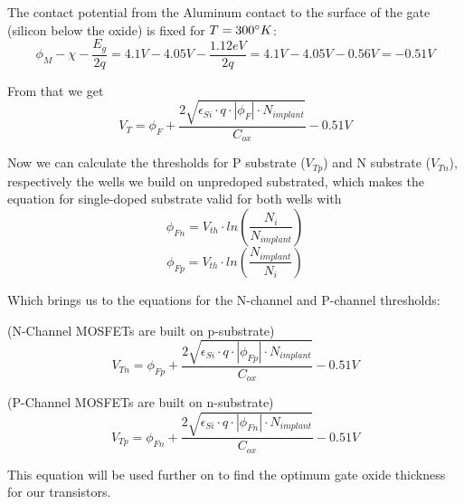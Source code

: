 The contact potential from the Aluminum contact to the surface of the gate (silicon below the oxide) is fixed for $T=300\degree K$:
\begin{equation}
\phi_{M} -  \chi - \frac{E_g}{2 q} = 4.1V - 4.05V - \frac{1.12eV}{2 q} = 4.1V - 4.05V - 0.56V = -0.51V
\end{equation}

From that we get
\begin{equation}
V_T = \phi_F + \frac{2 \sqrt{\epsilon_{Si}\cdot q \cdot \left| \phi_F \right| \cdot N_{implant} }}{C_{ox}} - 0.51V
\end{equation}

Now we can calculate the thresholds for P substrate ($V_{Tp}$) and N substrate  ($V_{Tn}$), respectively the wells we build on unpredoped substrated, which makes the equation for single-doped substrate valid for both wells with
\begin{equation}
\phi_{Fn}
=
V_{th} \cdot ln\left(\frac{N_i}{N_{implant}}\right)
\end{equation}
\begin{equation}
\phi_{Fp}
=
V_{th} \cdot ln\left(\frac{N_{implant}}{N_i}\right)
\end{equation}

Which brings us to the equations for the N-channel and P-channel thresholds:

(N-Channel MOSFETs are built on p-substrate)
\begin{equation}
V_{Tn} = \phi_{Fp} + \frac{2 \sqrt{\epsilon_{Si}\cdot q \cdot \left| \phi_{Fp} \right| \cdot N_{implant} }}{C_{ox}} - 0.51V
\end{equation}

(P-Channel MOSFETs are built on n-substrate)
\begin{equation}
V_{Tp} = \phi_{Fn} + \frac{2 \sqrt{\epsilon_{Si}\cdot q \cdot \left| \phi_{Fn} \right| \cdot N_{implant} }}{C_{ox}} - 0.51V
\end{equation}

This equation will be used further on to find the optimum gate oxide thickness for our transistors.
